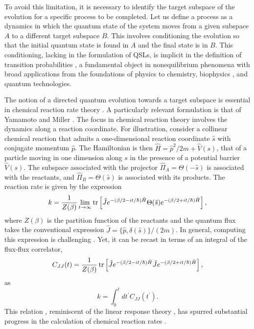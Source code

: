 \documentclass[prl,aps,amssymb,twocolumn,superscriptaddress, notitlepage, longbibliography]{revtex4-2}
\begin{document}
To avoid this limitation, it is necessary to identify the target subspace of the evolution for a specific process to be completed. Let us define a process as a dynamics in which the quantum state of the system moves from a given subspace $A$ to a different target subspace $B$. This involves conditioning the evolution so that the initial quantum state is found in $A$ and the final state is in $B$. This conditioning, lacking in the formulation of QSLs, is implicit in the definition of transition probabilities \cite{Feynman65}, a fundamental object in nonequilibrium phenomena with broad applications from the foundations of physics \cite{TQM1,TQM2} to chemistry, biophysics \cite{Makarov2015}, and quantum technologies.

The notion of a directed quantum evolution towards a target subspace is essential in chemical reaction rate theory \cite{Yamamoto60,Levine1969,McLafferty74,Miller74,Miller83,Miller93,Miller03,Hanggi90,Lidar99,Schatz02}.
A particularly relevant formulation is that of Yamamoto \cite{Yamamoto60} and Miller \cite{Miller74,Miller83,Miller93,Miller03}.
The focus in chemical reaction theory involves the dynamics along a reaction coordinate. For illustration, consider a collinear chemical reaction that admits a one-dimensional reaction coordinate $\hat{s}$ with conjugate momentum $\hat{p}$. The Hamiltonian is then $\hat{H}=\hat{p}^2/2m+\hat{V}(s)$, that of a particle moving in one dimension along $s$ in the presence of a potential barrier $\hat{V}(s)$.  The subspace associated with the projector $\hat{\Pi}_A=\Theta(-\hat{s})$ is associated with the reactants, and $\hat{\Pi}_B=\Theta(\hat{s})$ is associated with its products. The reaction rate is given by the expression
\begin{equation}
k=\frac{1}{Z(\beta)}\lim_{t\rightarrow\infty}\tr\left[\hat{J}e^{-(\beta/2-it/\hbar)\hat{H}}\Theta(\hat{s})e^{-(\beta/2+it/\hbar)\hat{H}}\right],
\end{equation}
where $Z(\beta)$ is the partition function of the reactants and the quantum flux takes the conventional expression $\hat{J}=\{\hat{p},\delta(\hat{s})\}/(2m)$.
In general, computing this expression is challenging \cite{Lidar99}.
Yet, it can be recast in terms of an integral of the flux-flux correlator,
\begin{equation}
C_{JJ}(t)=\frac{1}{Z(\beta)}\tr\left[\hat{J}e^{-(\beta/2-it/\hbar)\hat{H}}\hat{J}e^{-(\beta/2+it/\hbar)\hat{H}}\right],
\end{equation}
as
\begin{equation}
k=\int_0^tdt^\prime C_{JJ}\left(t^\prime\right).
\end{equation}
This relation \cite{Miller83}, reminiscent of the linear response theory \cite{Yamamoto60}, has spurred substantial progress in the calculation of chemical reaction rates \cite{Thompson1997,Chakraborty2005,Venkataraman2007,BoseNancy17}.
\end{document}
